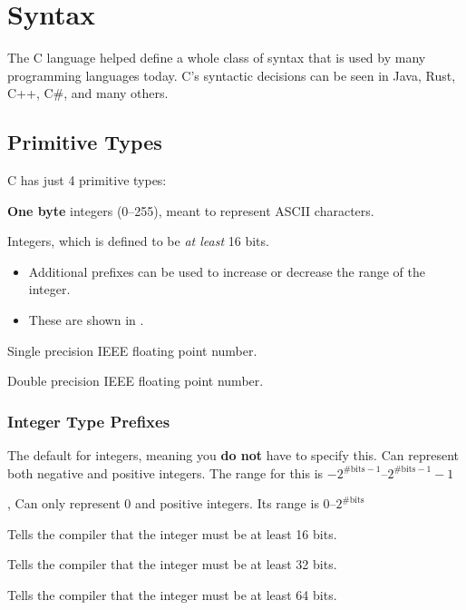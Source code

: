 \section{Syntax}\label{sec:Syntax}
The C language helped define a whole class of syntax that is used by many programming languages today.
C's syntactic decisions can be seen in Java, Rust, C++, C\#, and many others.

\subsection{Primitive Types}\label{subsec:Primitive_Types}
C has just 4 primitive types:
\begin{description}[noitemsep]
\item[\cinline{char}:] \textbf{One byte} integers (0--255), meant to represent ASCII characters.
\item[\cinline{int}:] Integers, which is defined to be \textit{at least} 16 bits.
  \begin{itemize}[noitemsep]
  \item Additional prefixes can be used to increase or decrease the range of the integer.
  \item These are shown in .
  \end{itemize}
\item[\cinline{float}:] Single precision IEEE floating point number.
\item[\cinline{double}:] Double precision IEEE floating point number.
\end{description}

\subsubsection{Integer Type Prefixes}\label{subsubsec:Integer_Type_Prefixes}
\begin{description}[noitemsep]
\item[\cinline{signed}:] The default for integers, meaning you \textbf{do not} have to specify this.
  Can represent both negative and positive integers.
  The range for this is $-2^{\text{\# bits} - 1}$--$2^{\text{\# bits} - 1}-1$
\item[\cinline{unsigned}:], Can only represent 0 and positive integers.
  Its range is $0$--$2^{\text{\# bits}}$
\item[\cinline{short}:] Tells the compiler that the integer must be at least 16 bits.
\item[\cinline{long}:] Tells the compiler that the integer must be at least 32 bits.
\item[\cinline{long long}:] Tells the compiler that the integer must be at least 64 bits.
\end{description}

